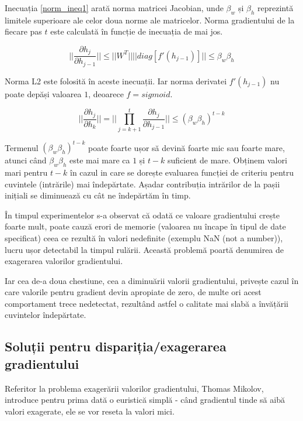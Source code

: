 Inecuația \ref{norm_ineq1} arată norma matricei Jacobian, unde $\beta_w$ și $\beta_h$ reprezintă limitele superioare ale celor doua norme ale matricelor. Norma gradientului de la fiecare pas $t$ este calculată în funcție de inecuația de mai jos.

\begin{equation}
	|| \frac{\partial h_j}{\partial h_{j-1}}|| \leq || W^T || || diag[f'(h_{j-1})]|| \leq \beta_w\beta_h
	\label{norm_ineq1}
\end{equation}

Norma L2 este folosită în aceste inecuații. Iar norma derivatei $f'(h_{j-1})$ nu poate depăși valoarea $1$, deoarece $f=sigmoid$.

\begin{equation}
	|| \frac{\partial h_j}{\partial h_k}|| = || \prod_{j=k+1}^{t} \frac{\partial h_j}{\partial h_{j-1}} || \leq (\beta_w\beta_h)^{t-k}
\end{equation}
 	
Termenul $(\beta_w\beta_h)^{t-k}$ poate foarte ușor să devină foarte mic sau foarte mare, atunci când $\beta_w\beta_h$ este mai mare ca $1$ și $t-k$ suficient de mare. Obținem valori mari pentru $t-k$ în cazul in care se dorește evaluarea funcției de criteriu pentru cuvintele (intrările) mai îndepărtate. Așadar contribuția intrărilor de la pașii inițiali se diminuează cu cât ne îndepărtăm în timp.

În timpul experimentelor s-a observat că odată ce valoare gradientului crește foarte mult, poate cauză erori de memorie (valoarea nu încape în tipul de date specificat) ceea ce rezultă în valori nedefinite (exemplu NaN (not a number)), lucru ușor detectabil la timpul rulării. Această problemă poartă denumirea de exagerarea valorilor gradientului.

Iar cea de-a doua chestiune, cea a diminuării valorii gradientului, privește cazul în care valorile pentru gradient devin apropiate de zero, de multe ori acest comportament trece nedetectat, rezultând astfel o calitate mai slabă a învățării cuvintelor îndepărtate.

\subsection{Soluții pentru dispariția/exagerarea gradientului}

Referitor la problema exagerării valorilor gradientului, Thomas Mikolov, introduce pentru prima dată o euristică simplă - când gradientul tinde să aibă valori exagerate, ele se vor reseta la valori mici.

